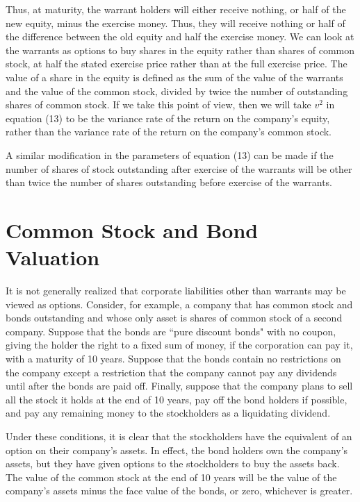 \documentclass[a4paper, 12pt, twoside]{article}
\begin{document}
Thus, at maturity, the warrant holders will either receive nothing, or half of the new 
equity, minus the exercise money. Thus, they will receive nothing or half of the 
difference between the old equity and half the exercise money.  We can look at the 
warrants as options to buy shares in the equity rather than shares of common stock, at 
half the stated exercise price rather than at the full exercise price. The value of a 
share in the equity is defined as the sum of the value of the warrants and the value 
of the common stock, divided by twice the number of outstanding shares of common 
stock. If we take this point of view, then we will take $v^2$ in equation (13) to be the 
variance rate of the return on the company's equity, rather than the variance rate of 
the return on the company's common stock.

A similar modification in the parameters of equation (13) can be made if the number of 
shares of stock outstanding after exercise of the warrants will be other than twice 
the number of shares outstanding before exercise of the warrants.

\section*{Common Stock and Bond Valuation}

It is not generally realized that corporate liabilities other than warrants may be 
viewed as options. Consider, for example, a company that has common stock and bonds 
outstanding and whose only asset is shares of common stock of a second company. 
Suppose that the bonds are ``pure discount bonds" with no coupon, giving the holder the 
right to a fixed sum of money, if the corporation can pay it, with a maturity of 10 
years. Suppose that the bonds contain no restrictions on the company except a 
restriction that the company cannot pay any dividends until after the bonds are paid 
off. Finally, suppose that the company plans to sell all the stock it holds at the end 
of 10 years, pay off the bond holders if possible, and pay any remaining money to the 
stockholders as a liquidating dividend.

Under these conditions, it is clear that the stockholders have the equivalent of an 
option on their company's assets. In effect, the bond holders own the company's 
assets, but they have given options to the stockholders to buy the assets back. The 
value of the common stock at the end of 10 years will be the value of the company's 
assets minus the face value of the bonds, or zero, whichever is greater.
\end{document}
